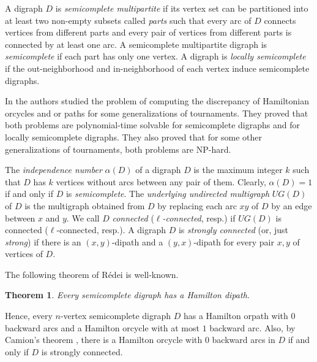 \documentclass{article}
\newcommand{\2}{\vspace{2mm}}
\newtheorem{theorem}{Theorem}[section]
\theoremstyle{definition}
\begin{document}
A digraph $D$ is {\em semicomplete multipartite} if its vertex set can be partitioned into at least two non-empty subsets called {\em parts} such that every arc of $D$ connects vertices from different parts and every pair of vertices from different parts is connected by at least one arc.  A semicomplete multipartite digraph is {\em semicomplete} if each part has only one vertex. A digraph is {\em locally semicomplete} if the out-neighborhood and in-neighborhood of each vertex induce semicomplete digraphs.

In \cite{Guo+SMDs} the authors studied the problem of computing the discrepancy of Hamiltonian orcycles and or paths for some  generalizations of tournaments. They proved that both problems are polynomial-time solvable for semicomplete digraphs and for locally semicomplete digraphs. They also proved that for some other generalizations of tournaments,  both problems are {\sf NP}-hard. 

The {\em independence number} $\alpha(D)$ of a digraph $D$ is the maximum integer $k$ such that $D$ has $k$ vertices without arcs between any pair of them.  Clearly, $\alpha(D)=1$ if and only if $D$ is {\em semicomplete}. 
The {\em underlying undirected multigraph} $UG(D)$ of $D$ is the multigraph obtained from $D$ by replacing each arc $xy$ of $D$ by an edge between $x$ and $y$. We call $D$ {\em connected} ({\em $\ell$-connected}, resp.) if $UG(D)$ is connected ($\ell$-connected, resp.). A digraph $D$ is {\em strongly connected} (or, just {\em strong}) if there is an $(x,y)$-dipath and a $(y,x)$-dipath for every pair $x,y$ of vertices of $D$. 

The following theorem of R{\'e}dei is well-known. 
\begin{theorem} \label{HamPathTour}\cite{redei_1934_hamilton_paths}
Every semicomplete digraph has a Hamilton dipath. 
\end{theorem}
Hence, every $n$-vertex semicomplete digraph $D$ has a Hamilton orpath with $0$ backward arcs and a Hamilton orcycle with at most $1$ backward arc.
Also, by Camion's theorem \cite{Camion59}, there is a Hamilton orcycle with $0$ backward arcs in $D$ if and only if $D$ is strongly connected. 
\end{document}
